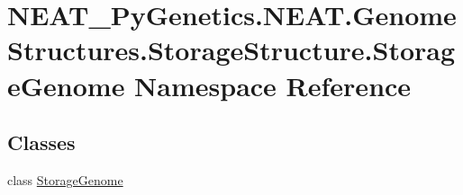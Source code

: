 \hypertarget{namespaceNEAT__PyGenetics_1_1NEAT_1_1GenomeStructures_1_1StorageStructure_1_1StorageGenome}{}\section{N\+E\+A\+T\+\_\+\+Py\+Genetics.\+N\+E\+A\+T.\+Genome\+Structures.\+Storage\+Structure.\+Storage\+Genome Namespace Reference}
\label{namespaceNEAT__PyGenetics_1_1NEAT_1_1GenomeStructures_1_1StorageStructure_1_1StorageGenome}
\subsection*{Classes}
\begin{DoxyCompactItemize}
\item 
class \hyperlink{classNEAT__PyGenetics_1_1NEAT_1_1GenomeStructures_1_1StorageStructure_1_1StorageGenome_1_1StorageGenome}{Storage\+Genome}
\end{DoxyCompactItemize}
